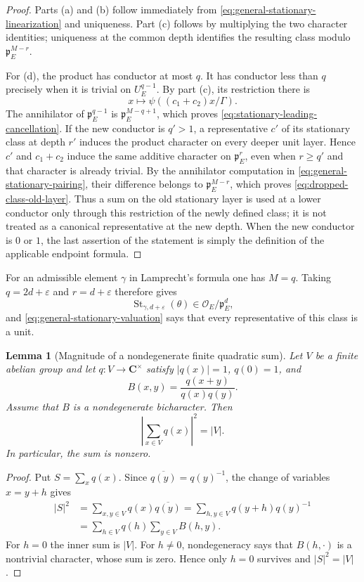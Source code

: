 \documentclass[11pt]{amsart}
\newtheorem{lemma}[theorem]{Lemma}
\theoremstyle{definition}
\theoremstyle{remark}
\newcommand{\C}{\mathbf C}
\newcommand{\cO}{\mathcal O}
\newcommand{\p}{\mathfrak p}
\begin{document}
\begin{proof}
Parts (a) and (b) follow immediately from
\eqref{eq:general-stationary-linearization} and uniqueness.  Part (c)
follows by multiplying the two character identities; uniqueness at the
common depth identifies the resulting class modulo $\p_E^{M-r}$.

For (d), the product has conductor at most $q$.  It has conductor less
than $q$ precisely when it is trivial on $U_E^{q-1}$.  By part (c), its
restriction there is
\[
 x\longmapsto\psi((c_1+c_2)x/\Gamma).
\]
The annihilator of $\p_E^{q-1}$ is $\p_E^{M-q+1}$, which proves
\eqref{eq:stationary-leading-cancellation}.  If the new conductor is
$q'>1$, a representative $c'$ of its stationary class at depth $r'$
induces the product character on every deeper unit layer.  Hence $c'$
and $c_1+c_2$ induce the same additive character on $\p_E^r$, even
when $r\ge q'$ and that character is already trivial.  By the
annihilator computation in
\eqref{eq:general-stationary-pairing}, their difference belongs to
$\p_E^{M-r}$, which proves
\eqref{eq:dropped-class-old-layer}.  Thus a sum on the old stationary
layer is used at a lower conductor only through this restriction of the
newly defined class; it is not treated as a canonical representative
at the new depth.  When the new conductor is $0$ or $1$, the last
assertion of the statement is simply the definition of the applicable
endpoint formula.
\end{proof}

For an admissible element $\gamma$ in Lamprecht's formula one has
$M=q$.  Taking $q=2d+\varepsilon$ and $r=d+\varepsilon$ therefore gives
\[
 \operatorname{St}_{\gamma,d+\varepsilon}(\theta)
 \in\cO_E/\p_E^d,
\]
and \eqref{eq:general-stationary-valuation} says that every
representative of this class is a unit.

\begin{lemma}[Magnitude of a nondegenerate finite quadratic sum]
\label{lem:finite-quadratic-magnitude}
Let $V$ be a finite abelian group and let $q:V\to\C^\times$ satisfy
$|q(x)|=1$, $q(0)=1$, and
\[
 B(x,y)=\frac{q(x+y)}{q(x)q(y)}.
\]
Assume that $B$ is a nondegenerate bicharacter.  Then
\begin{equation}\label{eq:finite-quadratic-magnitude}
 \left|\sum_{x\in V}q(x)\right|^2=|V|.
\end{equation}
In particular, the sum is nonzero.
\end{lemma}

\begin{proof}
Put $S=\sum_xq(x)$.  Since $\overline{q(y)}=q(y)^{-1}$, the change of
variables $x=y+h$ gives
\[
 \begin{aligned}
 |S|^2
 &=\sum_{x,y\in V}q(x)\overline{q(y)}
   =\sum_{h,y\in V}q(y+h)q(y)^{-1}\\
 &=\sum_{h\in V}q(h)\sum_{y\in V}B(h,y).
 \end{aligned}
\]
For $h=0$ the inner sum is $|V|$.  For $h\ne0$, nondegeneracy says that
$B(h,\cdot)$ is a nontrivial character, whose sum is zero.  Hence only
$h=0$ survives and $|S|^2=|V|$.
\end{proof}
\end{document}
